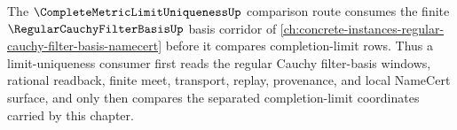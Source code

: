 \noindent The $\CompleteMetricLimitUniquenessUp$ comparison route consumes the finite $\RegularCauchyFilterBasisUp$ basis corridor of \autoref{ch:concrete-instances-regular-cauchy-filter-basis-namecert} before it compares completion-limit rows. Thus a limit-uniqueness consumer first reads the regular Cauchy filter-basis windows, rational readback, finite meet, transport, replay, provenance, and local NameCert surface, and only then compares the separated completion-limit coordinates carried by this chapter.
